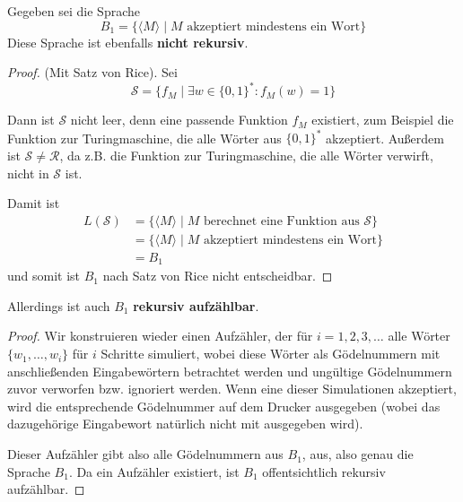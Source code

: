 Gegeben sei die Sprache
\[
	B_1 = \{ \langle M \rangle \mid M \text{ akzeptiert mindestens ein Wort} \}
\]
Diese Sprache ist ebenfalls \textbf{nicht rekursiv}.

\begin{proof} (Mit Satz von Rice).
Sei
\[
\mathcal{S} = \{f_M \mid \exists w \in \{0, 1\}^* : f_M(w) = 1\}
\]

Dann ist $\mathcal{S}$ nicht leer, denn eine passende Funktion $f_M$ existiert,
zum Beispiel die Funktion zur Turingmaschine, die alle Wörter aus $\{0, 1\}^*$
akzeptiert. Außerdem ist $\mathcal{S} \neq \mathcal{R}$, da z.B. die Funktion
zur Turingmaschine, die alle Wörter verwirft, nicht in $\mathcal{S}$ ist.

Damit ist
\begin{align*}
	L(\mathcal{S}) &= \{\langle M \rangle \mid M
		\text{ berechnet eine Funktion aus }\mathcal{S}\} \\
	&= \{\langle M \rangle \mid M \text{ akzeptiert mindestens ein Wort}\} \\
	&= B_1
\end{align*}
und somit ist $B_1$ nach Satz von Rice nicht entscheidbar.
\end{proof}

Allerdings ist auch $B_1$ \textbf{rekursiv aufzählbar}.

\begin{proof}
Wir konstruieren wieder einen Aufzähler, der für $i = 1, 2, 3, \dots$
alle Wörter $\{w_1, \dots, w_i\}$ für $i$ Schritte simuliert, wobei diese Wörter
als Gödelnummern mit anschließenden Eingabewörtern betrachtet werden und
ungültige Gödelnummern zuvor verworfen bzw. ignoriert werden. Wenn eine dieser
Simulationen akzeptiert, wird die entsprechende Gödelnummer auf dem Drucker
ausgegeben (wobei das dazugehörige Eingabewort natürlich nicht mit ausgegeben
wird).

Dieser Aufzähler gibt also alle Gödelnummern aus $B_1$, aus, also genau die
Sprache $B_1$. Da ein Aufzähler existiert, ist $B_1$ offentsichtlich rekursiv
aufzählbar.
\end{proof}
